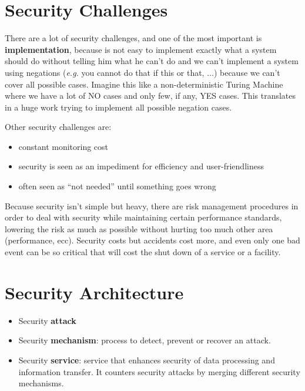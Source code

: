 \documentclass[oneside]{academica}
\begin{document}
\section{Security Challenges}

There are a lot of security challenges, and one of the most important is \textbf{implementation}, because is not easy to implement exactly what a system should do without telling him what he can't do and we can't implement a system using negations (\textit{e.g.} you cannot do that if this or that, $\ldots$) because we can't cover all possible cases.
Imagine this like a non-deterministic Turing Machine where we have a lot of NO cases and only few, if any, YES cases.
This translates in a huge work trying to implement all possible negation cases.

Other security challenges are:
\begin{itemize}
  \item constant monitoring cost
  \item security is seen as an impediment for efficiency and user-friendliness
  \item often seen as ``not needed'' until something goes wrong
\end{itemize}

Because security isn't simple but heavy, there are risk management procedures in order to deal with security while maintaining certain performance standards, lowering the risk as much as possible without hurting too much other area (performance, ecc).
Security costs but accidents cost more, and even only one bad event can be so critical that will cost the shut down of a service or a facility.

\section{Security Architecture}

\begin{itemize}
  \item Security \textbf{attack}
  \item Security \textbf{mechanism}: process to detect, prevent or recover an attack.
  \item Security \textbf{service}: service that enhances security of data processing and information transfer. It counters security attacks by merging different security mechanisms.
\end{itemize}
\end{document}
